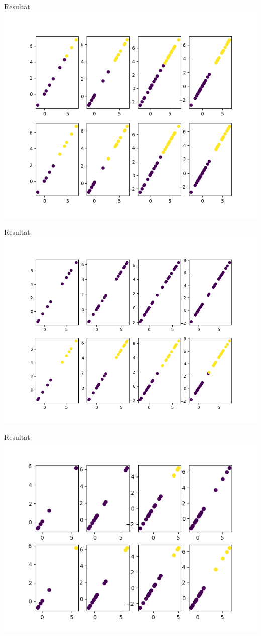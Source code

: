 \documentclass[11pt]{beamer}
\begin{document}
\begin{frame}{Resultat}
\includegraphics[scale=0.45]{ext7}
\end{frame}
\begin{frame}{Resultat}
\includegraphics[scale=0.4]{ext6}
\end{frame}
\begin{frame}{Resultat}
\includegraphics[scale=0.5]{ext8}
\end{frame}
\end{document}
